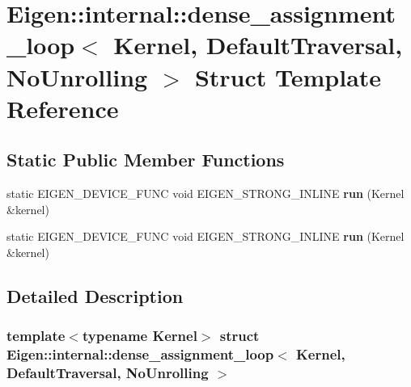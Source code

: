 \hypertarget{struct_eigen_1_1internal_1_1dense__assignment__loop_3_01_kernel_00_01_default_traversal_00_01_no_unrolling_01_4}{}\section{Eigen\+:\+:internal\+:\+:dense\+\_\+assignment\+\_\+loop$<$ Kernel, Default\+Traversal, No\+Unrolling $>$ Struct Template Reference}
\label{struct_eigen_1_1internal_1_1dense__assignment__loop_3_01_kernel_00_01_default_traversal_00_01_no_unrolling_01_4}
\subsection*{Static Public Member Functions}
\begin{DoxyCompactItemize}
\item 
\mbox{\label{struct_eigen_1_1internal_1_1dense__assignment__loop_3_01_kernel_00_01_default_traversal_00_01_no_unrolling_01_4_a8704abbb9459a7b5c0b6f52e4f9b089d}} 
static E\+I\+G\+E\+N\+\_\+\+D\+E\+V\+I\+C\+E\+\_\+\+F\+U\+NC void E\+I\+G\+E\+N\+\_\+\+S\+T\+R\+O\+N\+G\+\_\+\+I\+N\+L\+I\+NE {\bfseries run} (Kernel \&kernel)
\item 
\mbox{\label{struct_eigen_1_1internal_1_1dense__assignment__loop_3_01_kernel_00_01_default_traversal_00_01_no_unrolling_01_4_a8704abbb9459a7b5c0b6f52e4f9b089d}} 
static E\+I\+G\+E\+N\+\_\+\+D\+E\+V\+I\+C\+E\+\_\+\+F\+U\+NC void E\+I\+G\+E\+N\+\_\+\+S\+T\+R\+O\+N\+G\+\_\+\+I\+N\+L\+I\+NE {\bfseries run} (Kernel \&kernel)
\end{DoxyCompactItemize}


\subsection{Detailed Description}
\subsubsection*{template$<$typename Kernel$>$\newline
struct Eigen\+::internal\+::dense\+\_\+assignment\+\_\+loop$<$ Kernel, Default\+Traversal, No\+Unrolling $>$}



